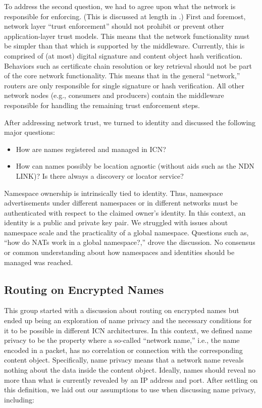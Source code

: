 \documentclass{sig-alternate-10pt}
\begin{document}
To address the second question, we had to agree upon what the network is responsible for enforcing. (This is discussed at length in \cite{trust}.)
First and foremost, network layer ``trust enforcement'' should not prohibit or prevent other application-layer trust models. This means that the network functionality must be simpler than that which is supported by the middleware. Currently, this is comprised of (at most) digital signature and content object hash verification. Behaviors such as certificate chain resolution or key retrieval should not be part of the core network functionality. This means that in the general ``network,'' routers are only responsible for single signature or hash verification. All other network nodes (e.g., consumers and producers) contain the middleware responsible for handling the remaining trust enforcement steps.

After addressing network trust, we turned to identity and discussed the following major questions:
%
\begin{itemize}
\item How are names registered and managed in ICN?
\item How can names possibly be location agnostic (without aids such as the NDN LINK)? Is there always a discovery or locator service?
\end{itemize}
%
Namespace ownership is intrinsically tied to identity. Thus, namespace advertisements under different namespaces or in different networks must be authenticated with respect to the claimed owner's identity. In this context, an identity is a public and private key pair. We struggled with issues about namespace scale and the practicality of a global namespace. Questions such as, ``how do NATs work in a global namespace?,'' drove the discussion. No consensus or common understanding about how namespaces and identities should be managed was reached.


\subsection{Routing on Encrypted Names}
This group started with a discussion about routing on encrypted names but ended up being an exploration of name privacy and the necessary conditions for it to be possible in different ICN architectures. In this context, we defined name privacy to be the property where a so-called ``network name,'' i.e., the name encoded in a packet, has no correlation or connection with the corresponding content object. Specifically, name privacy means that a network name reveals nothing about the data inside the content object. Ideally, names should reveal no more than what is currently revealed by an IP address and port. After settling on this definition, we laid out our assumptions to use when discussing name privacy, including:
\end{document}
